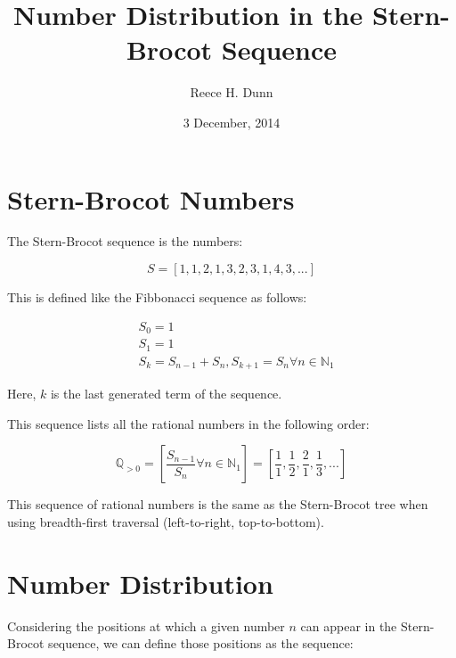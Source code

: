 \documentclass{article}
\title{Number Distribution in the Stern-Brocot Sequence}
\date{3 December, 2014}
\author{Reece H. Dunn}
\begin{document}
\maketitle

\section{Stern-Brocot Numbers}

The Stern-Brocot sequence is the numbers:

\begin{displaymath}
S = [1, 1, 2, 1, 3, 2, 3, 1, 4, 3, ...]
\end{displaymath}

\noindent
This is defined like the Fibbonacci sequence as follows:

\begin{displaymath}\begin{aligned}
& S_0 = 1 \\
& S_1 = 1 \\
& S_k = S_{n-1} + S_n, S_{k+1} = S_n \forall n \in \mathbb{N}_1
\end{aligned}\end{displaymath}

\noindent
Here, \begin{math}k\end{math} is the last generated term of the sequence.

\noindent
This sequence lists all the rational numbers in the following order:

\begin{displaymath}
\mathbb{Q}_{>0}
=
\left[
\frac{S_{n-1}}{S_n}
\forall n \in \mathbb{N}_{1}
\right]
=
\left[
\frac{1}{1},
\frac{1}{2},
\frac{2}{1},
\frac{1}{3},
...
\right]
\end{displaymath}

\noindent
This sequence of rational numbers is the same as the Stern-Brocot tree when
using breadth-first traversal (left-to-right, top-to-bottom).

\section{Number Distribution}

Considering the positions at which a given number \begin{math}n\end{math} can
appear in the Stern-Brocot sequence, we can define those positions as the
sequence:
\end{document}
